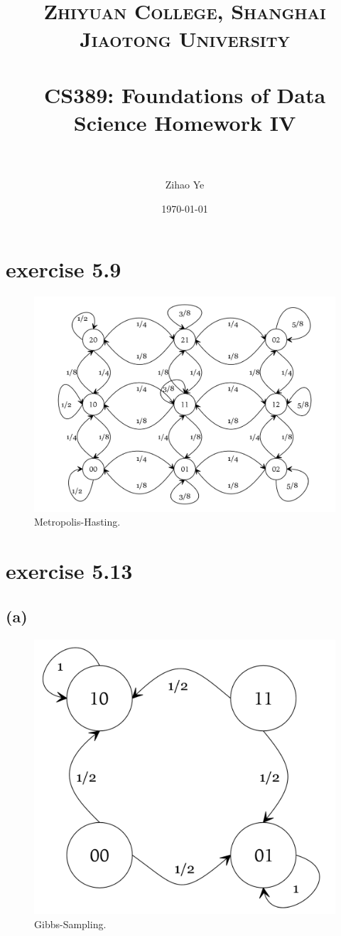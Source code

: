 \documentclass[paper=a4, fontsize=11pt]{scrartcl} %
\title{	
\normalfont \normalsize 
\textsc{Zhiyuan College, Shanghai Jiaotong University} \\ %
\horrule{0.5pt} \\[0.4cm] %
\huge CS389: Foundations of Data Science Homework IV\\ %
\horrule{2pt} \\ %
}
\author{Zihao Ye} %
\date{\normalsize\today} %
\numberwithin{equation}{section} %
\numberwithin{figure}{section} %
\numberwithin{table}{section} %
\begin{document}
\maketitle %

\section*{exercise 5.9}
\begin{figure}[H]
\centering
\includegraphics[width=350pt]{metro.png}
\caption{Metropolis-Hasting.}
\end{figure}

\section*{exercise 5.13}
\subsection*{(a)}

\begin{figure}[H]
	\centering
	\includegraphics[width=350pt]{gibbs-13.png}
	\caption{Gibbs-Sampling.}
\end{figure}
\end{document}
